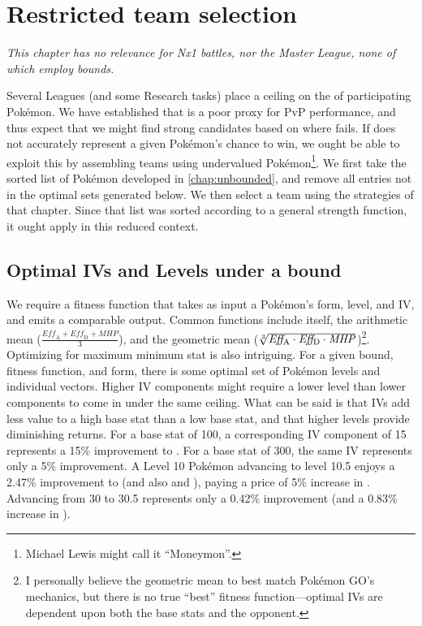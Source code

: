 \chapter{Restricted team selection\label{chap:bounded}}
\textit{This chapter has no relevance for Nx1 battles, nor the Master
  League, none of which employ \CP{} bounds.}
\bigskip

Several Leagues (and some Research tasks) place a ceiling on the \CP{} of
 participating Pokémon.
We have established that \CP{} is a poor proxy for PvP performance, and thus
 expect that we might find strong candidates based on where \CP{} fails.
If \CP{} does not accurately represent a given Pokémon's chance to win, we ought
 be able to exploit this by assembling teams using undervalued Pokémon\footnote{Michael Lewis might call it ``Moneymon''.}.
We first take the sorted list of Pokémon developed in \autoref{chap:unbounded},
 and remove all entries not in the optimal sets generated below.
We then select a team using the strategies of that chapter. Since
 that list was sorted according to a general strength function, it
 ought apply in this reduced context.

\section{Optimal IVs and Levels under a \CP{} bound}
We require a fitness function that takes as input a Pokémon's form, level, and IV,
  and emits a comparable output.
  Common functions include \CP{} itself, the arithmetic mean ($\frac{\mathit{Eff_\mathrm{A}} +\mathit{Eff_\mathrm{D}} + \mathit{MHP}}{3}$),
  and the geometric mean ($\sqrt[3]{\mbox{$\mathit{Eff_\mathrm{A}}$} \cdot \mbox{$\mathit{Eff_\mathrm{D}}$} \cdot \mbox{$\mathit{MHP}$}}$)\footnote{I personally believe the geometric mean to best match Pokémon GO's
  mechanics, but there is no true ``best'' fitness function---optimal IVs are
  dependent upon both the base stats and the opponent.}.
Optimizing for maximum minimum stat is also intriguing.
For a given \CP{} bound, fitness function, and form, there is some optimal set of Pokémon levels
 and individual vectors.
Higher IV components might require a lower level than lower components to
 come in under the same ceiling.
What can be said is that IVs add less value to a high base stat than a low
 base stat, and that higher levels provide diminishing returns.
For a base stat of 100, a corresponding IV component of 15 represents a
 15\% improvement to .
For a base stat of 300, the same IV represents only a 5\% improvement.
A Level 10 Pokémon advancing to level 10.5 enjoys a 2.47\% improvement to
  (and also  and ), paying a price of 5\% increase
 in \CP{}.
Advancing from 30 to 30.5 represents only a 0.42\% improvement (and a
 0.83\% increase in \CP{}).

